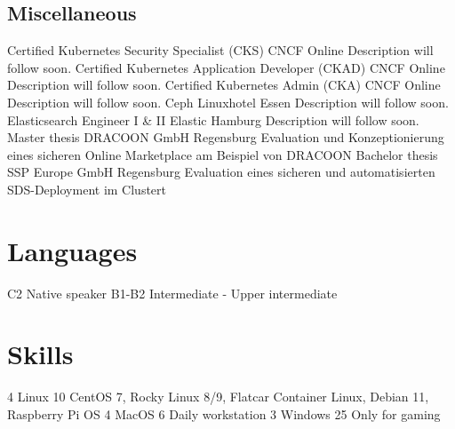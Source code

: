 \documentclass[11pt,a4paper,sans,final]{moderncv}
\begin{document}
		\subsection{Miscellaneous}
						{Certified Kubernetes Security Specialist (CKS)}	{CNCF}							{Online}		{}	{Description will follow soon.}
						{Certified Kubernetes Application Developer (CKAD)}	{CNCF}							{Online}		{}	{Description will follow soon.}
						{Certified Kubernetes Admin (CKA)}					{CNCF}							{Online}		{}	{Description will follow soon.}
						{Ceph}												{Linuxhotel}					{Essen}			{}	{Description will follow soon.}
						{Elasticsearch Engineer I \& II}					{Elastic}						{Hamburg}		{}	{Description will follow soon.}
						{Master thesis}										{DRACOON GmbH}					{Regensburg}	{}	{Evaluation und Konzeptionierung eines sicheren Online Marketplace am Beispiel von \mbox{DRACOON}}
						{Bachelor thesis}									{SSP Europe GmbH}				{Regensburg}	{}	{Evaluation eines sicheren und automatisierten SDS-Deployment im Clustert}
	
	\section{Languages}
			{C2}	{Native speaker}
			{B1-B2}	{Intermediate - Upper intermediate}
	
	\section{Skills}
	
	\cvskilllegend*[1em]{} %
	\cvskillhead[-0.1em] %
	\setcvskilllegendcolumns[][0.1]
	
							{4}	{Linux}								{10}	{CentOS 7, Rocky Linux 8/9, Flatcar Container Linux, Debian 11, Raspberry Pi OS}
		\cvskillentry		{}						{4}	{MacOS}								{6}		{Daily workstation}
		\cvskillentry		{}						{3}	{Windows}							{25}	{Only for gaming}
		
\end{document}
